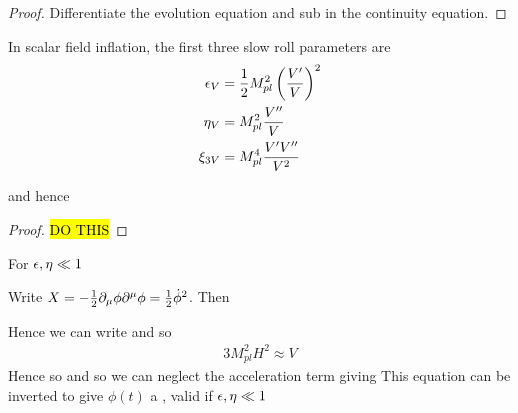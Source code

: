 \documentclass{article}
\begin{document}
\begin{prop}\label{prop:CSM:1}
\end{prop}
\begin{proof}
Differentiate the evolution equation and sub in the continuity equation. 
\end{proof}

\begin{definition}
In scalar field inflation, the first three slow roll parameters are 
\begin{align}\label{eq:CSM:13}
\epsilon_V &= \frac{1}{2} M_{pl}^2 \left( \frac{V^\prime}{V} \right)^2 \\
\eta_V &= M_{pl}^2 \frac{V^{\prime\prime}}{V} \\
\xi_{3V} &= M_{pl}^4 \frac{V^\prime V^{\prime\prime}}{V^2}
\end{align}
\end{definition}

\begin{prop}
and hence 
\end{prop}
\begin{proof}
\hl{DO THIS}
\end{proof}

\begin{corollary}
For $\epsilon,\eta \ll 1$
\end{corollary}

\begin{definition}
Write $X = -\frac{1}{2} \partial_\mu \phi \partial^\mu \phi = \frac{1}{2}\dot{\phi}^2$. Then 
\end{definition}

Hence we can write 
and so  
\begin{align}\label{eq:CSM:14}
3 M_{pl}^2 H^2 \approx V 
\end{align}
Hence 
so 
and so we can neglect the acceleration term giving 
This equation can be inverted to give $\phi(t)$ a , valid if $\epsilon,\eta \ll 1$
\end{document}
